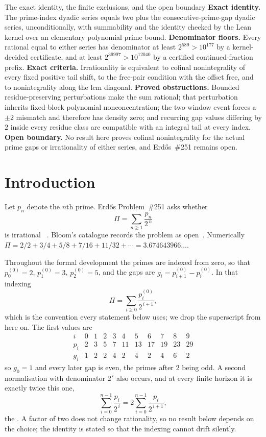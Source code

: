 \begin{paperresult}{The exact identity, the finite exclusions, and the open boundary}
\textbf{Exact identity.} The prime-index dyadic series equals two plus the
consecutive-prime-gap dyadic series, unconditionally, with summability and the
identity checked by the Lean kernel over an elementary polynomial prime bound.
\textbf{Denominator floors.} Every rational equal to either series has
denominator at least $2^{589}>10^{177}$ by a kernel-decided certificate, and at
least $2^{39997}>10^{12040}$ by a certified continued-fraction prefix.
\textbf{Exact criteria.} Irrationality is equivalent to cofinal nonintegrality
of every fixed positive tail shift, to the free-pair condition with the offset
free, and to nonintegrality along the lcm diagonal.
\textbf{Proved obstructions.} Bounded residue-preserving perturbations make the
sum rational; that perturbation inherits fixed-block polynomial
nonconcentration; the two-window event forces a $\pm2$ mismatch and therefore
has density zero; and recurring gap values differing by $2$ inside every
residue class are compatible with an integral tail at every index.
\textbf{Open boundary.} No result here proves cofinal nonintegrality for the
actual prime gaps or irrationality of either series, and Erd\H{o}s~\#251
remains open.
\end{paperresult}

\section{Introduction}\label{long251:sec:problem}

Let $p_n$ denote the $n$th prime.  Erd\H{o}s Problem~\#251 asks whether
\[
 \Pi=\sum_{n\ge1}\frac{p_n}{2^{\,n}}
\]
is irrational~\cite[p.~94]{erdos1958}\cite[p.~62]{erdosgraham1980}%
\cite[p.~103]{erdos1988}.  Bloom's catalogue records the problem as
open~\cite{erdosproblems}.  Numerically
$\Pi=2/2+3/4+5/8+7/16+11/32+\cdots=3.674643966\ldots$.

Throughout the formal development the primes are indexed from zero, so that
$p^{(0)}_0=2$, $p^{(0)}_1=3$, $p^{(0)}_2=5$, and the gaps are
$g_i=p^{(0)}_{i+1}-p^{(0)}_i$.  In that indexing
\[
 \Pi=\sum_{i\ge0}\frac{p^{(0)}_i}{2^{\,i+1}} ,
\]
which is the convention every statement below uses; we drop the superscript
from here on.  The first values are
\[
 \begin{array}{c|cccccccccc}
  i   & 0&1&2&3&4 &5 &6 &7 &8 &9\\\hline
  p_i & 2&3&5&7&11&13&17&19&23&29\\
  g_i & 1&2&2&4&2 &4 &2 &4 &6 &2
 \end{array}
\]
so $g_0=1$ and every later gap is even, the primes after $2$ being odd.
A second normalisation with denominator $2^{\,i}$ also occurs,
and at every finite horizon it is exactly twice this one,
\[
 \sum_{i=0}^{n-1}\frac{p_i}{2^{\,i}}
 =2\sum_{i=0}^{n-1}\frac{p_i}{2^{\,i+1}} ,
\]
the
.  A factor of two does not change rationality, so no result
below depends on the choice; the identity is stated so that the indexing cannot
drift silently.

